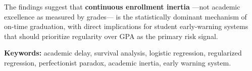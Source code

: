 The findings suggest that \textbf{continuous enrollment inertia} —not academic excellence
as measured by grades— is the statistically dominant mechanism of on-time graduation, with
direct implications for student early-warning systems that should prioritize regularity over
GPA as the primary risk signal.

\bigskip
\noindent\textbf{Keywords:} academic delay, survival analysis, logistic regression, regularized
regression, perfectionist paradox, academic inertia, early warning system.
